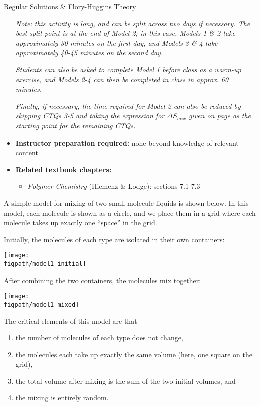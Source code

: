 \begin{activity}{Regular Solutions \& Flory-Huggins Theory}
\begin{instructornotes}
\begin{itemize}
			\emph{Note: this activity is long, and can be split across two days if necessary.  The best split point is at the end of Model 2; in this case, Models 1 \& 2 take approximately 30 minutes on the first day, and Models 3 \& 4 take approximately 40-45 minutes on the second day.}
			
			\emph{Students can also be asked to complete Model 1 before class as a warm-up exercise, and Models 2-4 can then be completed in class in approx. 60 minutes.}
			
			\emph{Finally, if necessary, the time required for Model 2 can also be reduced by skipping CTQs 3-5 and taking the expression for $\Delta S_{mix}$ given on page \pageref{eqn:stirling} as the starting point for the remaining CTQs.}
		\item \textbf{Instructor preparation required:} none beyond knowledge of relevant content
		\item \textbf{Related textbook chapters:}
			\begin{itemize}
				\item \emph{Polymer Chemistry} (Hiemenz \& Lodge): sections 7.1-7.3
		\end{itemize}
	\end{itemize}

\end{instructornotes}


\begin{model}
\label{\labelbase:mdl:idealtoy}

A simple model for mixing of two small-molecule liquids is shown below.  In this model, each molecule is shown as a circle, and we place them in a grid where each molecule takes up exactly one ``space'' in the grid.

Initially, the molecules of each type are isolated in their own containers:

\centerline{\texttt{[image: \\figpath/model1-initial]}}

After combining the two containers, the molecules mix together:

\vspace{6pt}
\centerline{\texttt{[image: \\figpath/model1-mixed]}}

The critical elements of this model are that
\begin{enumerate}[itemsep=0pt,topsep=-6pt]
	\item the number of molecules of each type does not change,
	\item the molecules each take up exactly the same volume (here, one square on the grid),
	\item the total volume after mixing is the sum of the two initial volumes, and
	\item the mixing is entirely random.
\end{enumerate}


\end{model}
\end{activity}
